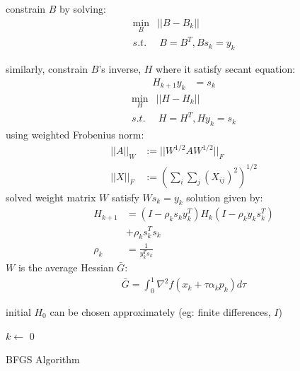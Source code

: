 \documentclass[8pt,letter]{article}
\begin{document}
\begin{multicols*}{2}
  constrain $B$ by solving:
  \begin{align*}
    \min_B & ||B-B_k||\\
    s.t. & \ B=B^T, Bs_k=y_k
  \end{align*}

  similarly, constrain $B$'s inverse, $H$ where it satisfy secant equation:
  \begin{align*}
    H_{k+1}y_k & = s_k
  \end{align*}
  \begin{align*}
    \min_H & ||H-H_k||\\
    s.t. & \ H=H^T, Hy_k=s_k
  \end{align*}
  using weighted Frobenius norm:
  \begin{align*}
    ||A||_W & := ||W^{1/2}AW^{1/2}||_F\\
    ||X||_F & := (\sum_i \sum_j (X_{ij})^2)^{1/2}
  \end{align*}
  solved weight matrix $W$ satisfy $Ws_k=y_k$
  solution given by:
  \begin{align*}
    H_{k+1} & = (I-\rho_k s_k y_k^T)H_k(I-\rho_ky_ks_k^T) \\
            &+ \rho_k s_k^T s_k\\
    \rho_k & = \frac{1}{y_k^Ts_k}
  \end{align*}
  $W$ is the average Hessian $\bar{G}$:
  \begin{align*}
    \bar{G} = \int_0^1 \nabla^2 f(x_k+\tau \alpha_k p_k) d\tau
  \end{align*}
  
  initial $H_0$ can be chosen approximately (eg: finite differences, $I$)
  
  \begin{algorithm}[H]
    $k \leftarrow$ 0\\
    \caption{BFGS Algorithm\label{Algo_BFGS}}
  \end{algorithm}
  

\end{multicols*}
\end{document}
